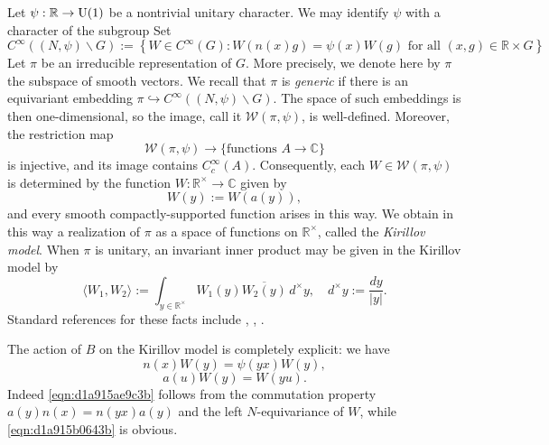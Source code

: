 \documentclass[reqno]{amsart} 
\numberwithin{equation}{section}
\begin{document}
Let $\psi : \mathbb{R} \rightarrow \operatorname{U}(1)$ be a nontrivial unitary character.  We may identify $\psi$ with a character of the subgroup Set
\begin{equation*}
  C^\infty((N,\psi) \backslash G) := \left\{ W \in C^\infty(G): W(n(x) g) = \psi(x) W(g) \text{ for all } (x,g) \in \mathbb{R} \times G \right\}
\end{equation*}
Let $\pi$ be an irreducible representation of $G$.  More precisely, we denote here by $\pi$ the subspace of smooth vectors.  We recall that $\pi$ is \emph{generic} if there is an equivariant embedding $\pi \hookrightarrow C^\infty((N,\psi) \backslash G)$.  The space of such embeddings is then one-dimensional, so the image, call it $\mathcal{W}(\pi,\psi)$, is well-defined.  Moreover, the restriction map
\begin{equation*}
  \mathcal{W}(\pi,\psi) \rightarrow \{\text{functions } A \rightarrow \mathbb{C} \}
\end{equation*}
is injective, and its image contains $C_c^\infty(A)$.  Consequently, each $W \in \mathcal{W}(\pi,\psi)$ is determined by the function $W : \mathbb{R}^\times \rightarrow \mathbb{C}$ given by
\begin{equation*}
  W(y) := W(a(y)),
\end{equation*}
and every smooth compactly-supported function arises in this way.  We obtain in this way a realization of $\pi$ as a space of functions on $\mathbb{R}^\times$, called the \emph{Kirillov model}.  When $\pi$ is unitary, an invariant inner product may be given in the Kirillov model by
\begin{equation}\label{eqn:d1a915c9af68}
  \langle W_1, W_2 \rangle := \int_{y \in \mathbb{R}^\times } W_1(y) \overline{W_2(y)} \, d^\times y, \quad
  d^\times y := \frac{d y}{\lvert y \rvert}.
\end{equation}
Standard references for these facts include \cite[\S6]{MR748505}, \cite[\S10.2]{MR1999922}, \cite{MR2733072}.

The action of $B$ on the Kirillov model is completely explicit: we have
\begin{equation}\label{eqn:d1a915ae9c3b}
  n(x) W(y) = \psi(y x) W(y),
\end{equation}
\begin{equation}\label{eqn:d1a915b0643b}
  a(u) W(y) = W(y u).
\end{equation}
Indeed \eqref{eqn:d1a915ae9c3b} follows from the commutation property $a(y) n(x) = n(y x) a(y)$ and the left $N$-equivariance of $W$, while \eqref{eqn:d1a915b0643b} is obvious.
\end{document}
